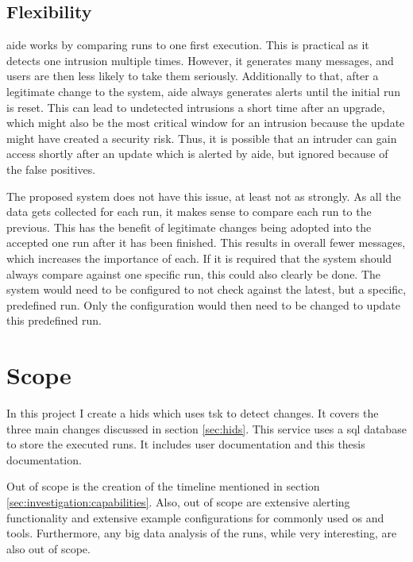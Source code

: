 \subsection{Flexibility}

\Gls{aide} works by comparing runs to one first execution. This is practical as it detects one intrusion multiple times. However, it generates many messages, and users are then less likely to take them seriously. Additionally to that, after a legitimate change to the system, \gls{aide} always generates alerts until the initial run is reset. This can lead to undetected intrusions a short time after an upgrade, which might also be the most critical window for an intrusion because the update might have created a security risk. Thus, it is possible that an intruder can gain access shortly after an update which is alerted by \gls{aide}, but ignored because of the false positives.

The proposed system does not have this issue, at least not as strongly. As all the data gets collected for each run, it makes sense to compare each run to the previous. This has the benefit of legitimate changes being adopted into the accepted one run after it has been finished. This results in overall fewer messages, which increases the importance of each. If it is required that the system should always compare against one specific run, this could also clearly be done. The system would need to be configured to not check against the latest, but a specific, predefined run. Only the configuration would then need to be changed to update this predefined run. 

\section{Scope}

In this project I create a \gls{hids} which uses \gls{tsk} to detect changes. It covers the three main changes discussed in section \ref{sec:hids}. This service uses a \gls{sql} database to store the executed runs. It includes user documentation and this thesis documentation. 

Out of scope is the creation of the timeline mentioned in section \ref{sec:investigation:capabilities}. Also, out of scope are extensive alerting functionality and extensive example configurations for commonly used \gls{os} and tools. Furthermore, any big data analysis of the runs, while very interesting, are also out of scope.

